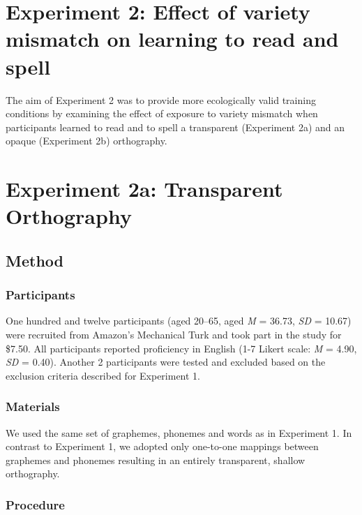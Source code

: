 \documentclass[doc,floatsintext]{apa6}
\begin{document}
\section{Experiment 2: Effect of variety mismatch on learning to read
and
spell}\label{experiment-2-effect-of-variety-mismatch-on-learning-to-read-and-spell}

The aim of Experiment 2 was to provide more ecologically valid training
conditions by examining the effect of exposure to variety mismatch when
participants learned to read and to spell a transparent (Experiment 2a)
and an opaque (Experiment 2b) orthography.

\section{Experiment 2a: Transparent
Orthography}\label{experiment-2a-transparent-orthography}

\subsection{Method}\label{method-1}

\subsubsection{Participants}\label{participants-1}

One hundred and twelve participants (aged 20--65, aged \emph{M} = 36.73,
\emph{SD} = 10.67) were recruited from Amazon's Mechanical Turk and took
part in the study for \$7.50. All participants reported proficiency in
English (1-7 Likert scale: \emph{M} = 4.90, \emph{SD} = 0.40). Another 2
participants were tested and excluded based on the exclusion criteria
described for Experiment 1.

\subsubsection{Materials}\label{materials-1}

We used the same set of graphemes, phonemes and words as in Experiment
1. In contrast to Experiment 1, we adopted only one-to-one mappings
between graphemes and phonemes resulting in an entirely transparent,
shallow orthography.

\subsubsection{Procedure}\label{procedure-1}
\end{document}
